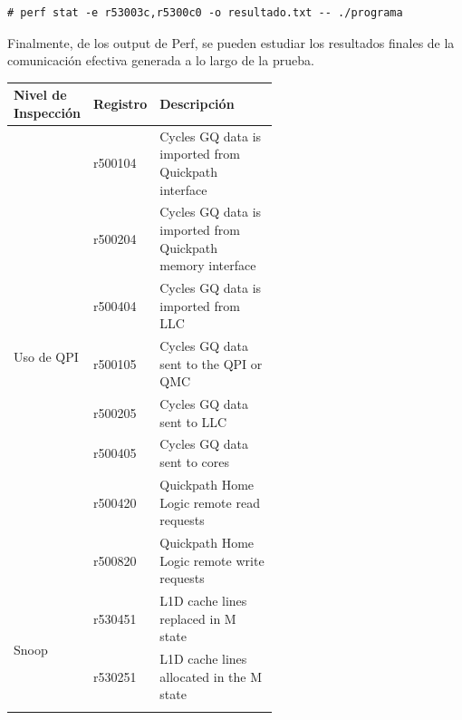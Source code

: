 \begin{lstlisting}[style=BashInputStyle, breaklines=true, captionpos=b, caption={Ejemplo de uso de Perf para colectar datos de una colección de eventos sobre un script llamado programa. En éste caso se configura para colectar datos de 2 eventos y dejar el reporte de salida en un archivo resultado.txt}]
	# perf stat -e r53003c,r5300c0 -o resultado.txt -- ./programa
\end{lstlisting}

Finalmente, de los output de Perf, se pueden estudiar los resultados finales de la comunicación efectiva generada a lo largo de la prueba.

\begin{table}[]
\centering
\begin{tabular}{|l|l|p{0.58\linewidth}|}
\hline
Nivel de Inspección                 & Registro & Descripción                                                \\ \hline
\multirow{8}{*}{Uso de QPI}         & r500104  & Cycles GQ data is imported from Quickpath interface        \\ \cline{2-3} 
                                    & r500204  & Cycles GQ data is imported from Quickpath memory interface \\ \cline{2-3} 
                                    & r500404  & Cycles GQ data is imported from LLC                        \\ \cline{2-3} 
                                    & r500105  & Cycles GQ data sent to the QPI or QMC                      \\ \cline{2-3} 
                                    & r500205  & Cycles GQ data sent to LLC                                 \\ \cline{2-3} 
                                    & r500405  & Cycles GQ data sent to cores                               \\ \cline{2-3} 
                                    & r500420  & Quickpath Home Logic remote read requests                  \\ \cline{2-3} 
                                    & r500820  & Quickpath Home Logic remote write requests                 \\ \hline
\multirow{3}{*}{Snoop}              & r530451  & L1D cache lines replaced in M state                        \\ \cline{2-3} 
                                    & r530251  & L1D cache lines allocated in the M state                   \\ \cline{2-3} 

\end{tabular}
\end{table}
